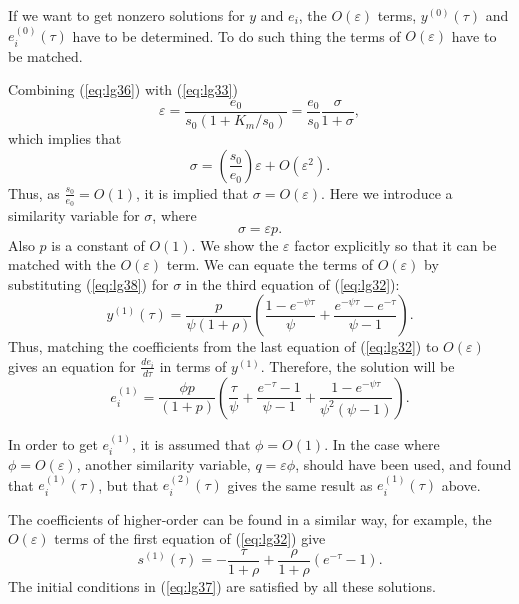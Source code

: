 \documentclass[a4paper]{report}
\theoremstyle{definition}
\begin{document}
If we want to get nonzero solutions for $y$ and $e_i$, the $O(\varepsilon)$ terms, $y^{(0)}(\tau)$ and $e_i^{(0)}(\tau)$ have to be determined. To do such thing the terms of $O(\varepsilon)$ have to be matched.

Combining (\ref{eq:lg36}) with (\ref{eq:lg33})
\begin{equation}
\varepsilon=\frac{e_0}{s_0(1+K_m/s_0)}=\frac{e_0}{s_0}\frac{\sigma}{1+\sigma},
\end{equation}
which implies that
\begin{equation}
\sigma=(\frac{s_0}{e_0})\varepsilon +O(\varepsilon^2).
\end{equation}
Thus, as $\frac{s_0}{e_0}=O(1)$, it is implied that $\sigma=O(\varepsilon)$. Here we introduce a similarity variable for $\sigma$, where
\begin{equation}
\sigma=\varepsilon p.
\label{eq:lg38}
\end{equation}
Also $p$ is a constant of $O(1)$. We show the $\varepsilon$ factor explicitly so that it can be matched with the $O(\varepsilon)$ term. We can equate the terms of $O(\varepsilon)$ by substituting (\ref{eq:lg38}) for $\sigma$ in the third equation of (\ref{eq:lg32}):
\begin{equation}
y^{(1)}(\tau)=\frac{p}{\psi(1+\rho)}\left(\frac{1-e^{-\psi\tau}}{\psi}+\frac{e^{-\psi\tau}-e^{-\tau}}{\psi -1}\right).
\end{equation}
Thus, matching the coefficients from the last equation of (\ref{eq:lg32}) to $O(\varepsilon)$ gives an equation for $\frac{de_i}{d\tau}$ in terms of $y^{(1)}$. Therefore, the solution will be 
\begin{equation}
e_i^{(1)}=\frac{\phi p}{(1+p)}\left(\frac{\tau}{\psi}+\frac{e^{-\tau}-1}{\psi -1}+\frac{1-e^{-\psi \tau}}{\psi^2(\psi-1)}\right).
\end{equation}


In order to get $e_i^{(1)}$, it is assumed that $\phi=O(1)$. In the case where $\phi=O(\varepsilon)$, another similarity variable, $q=\varepsilon \phi$, should have been used, and found that $e_i^{(1)}(\tau)$, but that $e_i^{(2)}(\tau)$ gives the same result as $e_i^{(1)}(\tau)$ above.

The coefficients of higher-order can be found in a similar way, for example, the $O(\varepsilon)$ terms of the first equation of (\ref{eq:lg32}) give
\begin{equation}
s^{(1)}(\tau)=-\frac{\tau}{1+\rho}+\frac{\rho}{1+\rho}(e^{-\tau}-1).
\end{equation}
The initial conditions in (\ref{eq:lg37}) are satisfied by all these solutions.
\\
\end{document}

